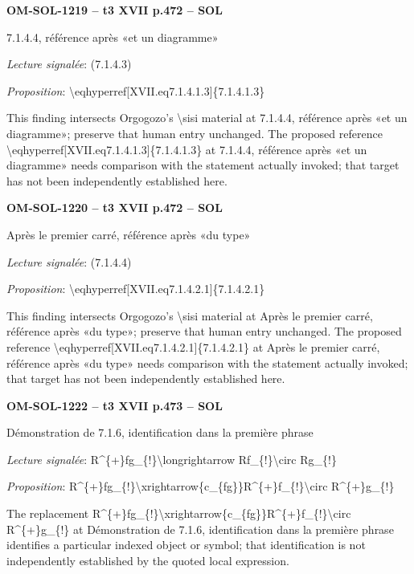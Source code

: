 \par\noindent\textbf{OM-SOL-1219 -- t3 XVII p.472 -- SOL}\par
7.1.4.4, référence après «et un diagramme»\par
\emph{Lecture signalée}: (7.1.4.3)\par
\emph{Proposition}: \textbackslash{}eqhyperref[XVII.eq7.1.4.1.3]\{7.1.4.1.3\}\par
This finding intersects Orgogozo's \textbackslash{}sisi material at 7.1.4.4, référence après «et un diagramme»; preserve that human entry unchanged. The proposed reference \textbackslash{}eqhyperref[XVII.eq7.1.4.1.3]\{7.1.4.1.3\} at 7.1.4.4, référence après «et un diagramme» needs comparison with the statement actually invoked; that target has not been independently established here.\par
\par\noindent\textbf{OM-SOL-1220 -- t3 XVII p.472 -- SOL}\par
Après le premier carré, référence après «du type»\par
\emph{Lecture signalée}: (7.1.4.4)\par
\emph{Proposition}: \textbackslash{}eqhyperref[XVII.eq7.1.4.2.1]\{7.1.4.2.1\}\par
This finding intersects Orgogozo's \textbackslash{}sisi material at Après le premier carré, référence après «du type»; preserve that human entry unchanged. The proposed reference \textbackslash{}eqhyperref[XVII.eq7.1.4.2.1]\{7.1.4.2.1\} at Après le premier carré, référence après «du type» needs comparison with the statement actually invoked; that target has not been independently established here.\par
\par\noindent\textbf{OM-SOL-1222 -- t3 XVII p.473 -- SOL}\par
Démonstration de 7.1.6, identification dans la première phrase\par
\emph{Lecture signalée}: R\textasciicircum{}\{+\}fg\_\{!\}\textbackslash{}longrightarrow Rf\_\{!\}\textbackslash{}circ Rg\_\{!\}\par
\emph{Proposition}: R\textasciicircum{}\{+\}fg\_\{!\}\textbackslash{}xrightarrow\{c\_\{fg\}\}R\textasciicircum{}\{+\}f\_\{!\}\textbackslash{}circ R\textasciicircum{}\{+\}g\_\{!\}\par
The replacement R\textasciicircum{}\{+\}fg\_\{!\}\textbackslash{}xrightarrow\{c\_\{fg\}\}R\textasciicircum{}\{+\}f\_\{!\}\textbackslash{}circ R\textasciicircum{}\{+\}g\_\{!\} at Démonstration de 7.1.6, identification dans la première phrase identifies a particular indexed object or symbol; that identification is not independently established by the quoted local expression.\par
